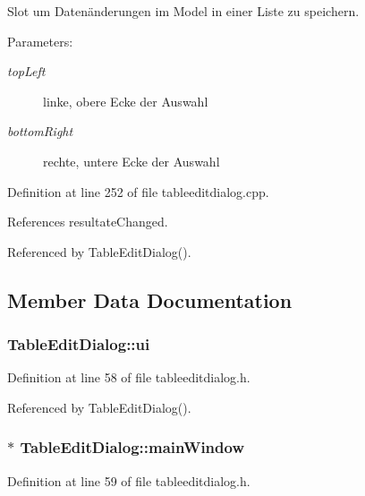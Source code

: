 Slot um Datenänderungen im Model in einer Liste zu speichern. 

\begin{Desc}
\item[Parameters:]
\begin{description}
\item[{\em topLeft}]linke, obere Ecke der Auswahl \item[{\em bottomRight}]rechte, untere Ecke der Auswahl \end{description}
\end{Desc}


Definition at line 252 of file tableeditdialog.cpp.

References resultateChanged.

Referenced by TableEditDialog().

\subsection{Member Data Documentation}
\hypertarget{class_table_edit_dialog_f63889b474e6ccf0d2dc0d7c1deb44c9}{
\subsubsection[ui]{ {\bf TableEditDialog::ui}}}
\label{class_table_edit_dialog_f63889b474e6ccf0d2dc0d7c1deb44c9}




Definition at line 58 of file tableeditdialog.h.

Referenced by TableEditDialog().\hypertarget{class_table_edit_dialog_91a07844cd384a7efa73a77d2e168586}{
\subsubsection[mainWindow]{$\ast$ {\bf TableEditDialog::mainWindow}}}
\label{class_table_edit_dialog_91a07844cd384a7efa73a77d2e168586}




Definition at line 59 of file tableeditdialog.h.

